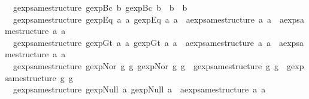 \begin{isabellebody}
\ \ {\isachardoublequoteopen}gexp{\isacharunderscore}same{\isacharunderscore}structure\ {\isacharparenleft}gexp{\isachardot}Bc\ b{\isacharparenright}\ {\isacharparenleft}gexp{\isachardot}Bc\ b{\isacharprime}{\isacharparenright}\ {\isacharequal}\ {\isacharparenleft}b\ {\isacharequal}\ b{\isacharprime}{\isacharparenright}{\isachardoublequoteclose}\ {\isacharbar}\isanewline
\ \ {\isachardoublequoteopen}gexp{\isacharunderscore}same{\isacharunderscore}structure\ {\isacharparenleft}gexp{\isachardot}Eq\ a{}\ a{}{\isacharparenright}\ {\isacharparenleft}gexp{\isachardot}Eq\ a{}{\isacharprime}\ a{}{\isacharprime}{\isacharparenright}\ {\isacharequal}\ {\isacharparenleft}aexp{\isacharunderscore}same{\isacharunderscore}structure\ a{}\ a{}{\isacharprime}\ {\isasymand}\ aexp{\isacharunderscore}same{\isacharunderscore}structure\ a{}\ a{}{\isacharprime}{\isacharparenright}{\isachardoublequoteclose}\ {\isacharbar}\isanewline
\ \ {\isachardoublequoteopen}gexp{\isacharunderscore}same{\isacharunderscore}structure\ {\isacharparenleft}gexp{\isachardot}Gt\ a{}\ a{}{\isacharparenright}\ {\isacharparenleft}gexp{\isachardot}Gt\ a{}{\isacharprime}\ a{}{\isacharprime}{\isacharparenright}\ {\isacharequal}\ {\isacharparenleft}aexp{\isacharunderscore}same{\isacharunderscore}structure\ a{}\ a{}{\isacharprime}\ {\isasymand}\ aexp{\isacharunderscore}same{\isacharunderscore}structure\ a{}\ a{}{\isacharprime}{\isacharparenright}{\isachardoublequoteclose}\ {\isacharbar}\isanewline
\ \ {\isachardoublequoteopen}gexp{\isacharunderscore}same{\isacharunderscore}structure\ {\isacharparenleft}gexp{\isachardot}Nor\ g{}\ g{}{\isacharparenright}\ {\isacharparenleft}gexp{\isachardot}Nor\ g{}{\isacharprime}\ g{}{\isacharprime}{\isacharparenright}\ {\isacharequal}\ {\isacharparenleft}gexp{\isacharunderscore}same{\isacharunderscore}structure\ g{}\ g{}{\isacharprime}\ {\isasymand}\ gexp{\isacharunderscore}same{\isacharunderscore}structure\ g{}\ g{}{\isacharprime}{\isacharparenright}{\isachardoublequoteclose}\ {\isacharbar}\isanewline
\ \ {\isachardoublequoteopen}gexp{\isacharunderscore}same{\isacharunderscore}structure\ {\isacharparenleft}gexp{\isachardot}Null\ a{}{\isacharparenright}\ {\isacharparenleft}gexp{\isachardot}Null\ a{}{\isacharparenright}\ {\isacharequal}\ aexp{\isacharunderscore}same{\isacharunderscore}structure\ a{}\ a{}{\isachardoublequoteclose}\ {\isacharbar}\isanewline

\end{isabellebody}

